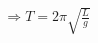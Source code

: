 \documentclass[preview]{standalone}
\begin{document}
\begin{align*}
\Rightarrow T = 2\pi \sqrt{\frac{L}{g}}
\end{align*}
\end{document}
